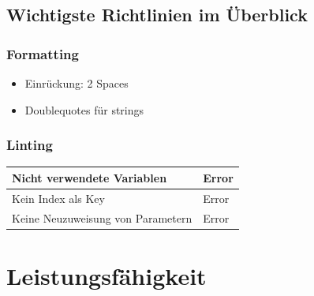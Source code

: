 \documentclass[a4paper, titlepage]{article}
\begin{document}
  \subsection{Wichtigste Richtlinien im Überblick}
  \subsubsection{Formatting}
  \begin{itemize}
    \item Einrückung: 2 Spaces
    \item Doublequotes für strings
  \end{itemize}
  \subsubsection{Linting}
  \begin{tabularx}{\textwidth}{|X|X|}
    \hline
    Nicht verwendete Variablen & Error \\
    \hline
    Kein Index als Key & Error \\
    \hline
    Keine Neuzuweisung von Parametern & Error \\
    \hline
  \end{tabularx}

  \section{Leistungsfähigkeit}
\end{document}
